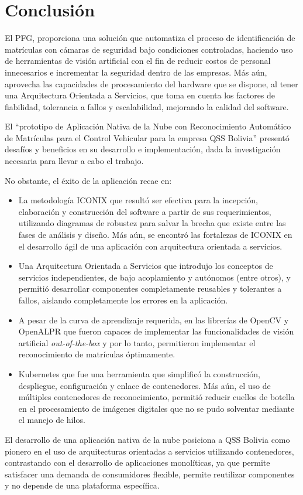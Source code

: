 \chapter{Conclusión}
El PFG, proporciona una solución que automatiza el proceso de identificación de matrículas con cámaras de seguridad bajo condiciones controladas, haciendo uso de herramientas de visión artificial con el fin de reducir costos de personal innecesarios e incrementar la seguridad dentro de las empresas. Más aún, aprovecha las capacidades de procesamiento del hardware que se dispone, al tener una Arquitectura Orientada a Servicios, que toma en cuenta los factores de  fiabilidad, tolerancia a fallos y escalabilidad, mejorando la calidad del software.

El “prototipo de Aplicación Nativa de la Nube con Reconocimiento Automático de Matrículas para el Control Vehicular para la empresa QSS Bolivia” presentó desafíos y beneficios en su desarrollo e implementación, dada la investigación necesaria para llevar a cabo el trabajo.

No obstante, el éxito de la aplicación recae en:
\begin{itemize}
    \item La metodología ICONIX que resultó ser efectiva para la incepción, elaboración y construcción del software a partir de sus requerimientos, utilizando diagramas de robustez para salvar la brecha que existe entre las fases de análisis y diseño. Más aún, se encontró las fortalezas de ICONIX en el desarrollo ágil de una aplicación con arquitectura orientada a servicios. 
\item Una Arquitectura Orientada a Servicios que introdujo los conceptos de servicios independientes, de bajo acoplamiento y autónomos (entre otros), y permitió desarrollar componentes completamente reusables y tolerantes a fallos, aislando completamente los errores en la aplicación.
\item A pesar de la curva de aprendizaje requerida, en las librerías de OpenCV y OpenALPR que fueron capaces de implementar las funcionalidades de visión artificial \textit{out-of-the-box} y por lo tanto, permitieron implementar el reconocimiento de matrículas óptimamente.
\item Kubernetes que fue una herramienta que simplificó la construcción, despliegue, configuración y enlace de contenedores. Más aún, el uso de múltiples contenedores de reconocimiento, permitió reducir cuellos de botella en el procesamiento de imágenes digitales que no se pudo solventar mediante el manejo de hilos.
\end{itemize}
El desarrollo de una aplicación nativa de la nube posiciona a QSS Bolivia como pionero en el uso de arquitecturas orientadas a servicios utilizando contenedores, contrastando con el desarrollo de aplicaciones monolíticas, ya que permite satisfacer una demanda de consumidores flexible, permite reutilizar componentes y no depende de una plataforma específica.